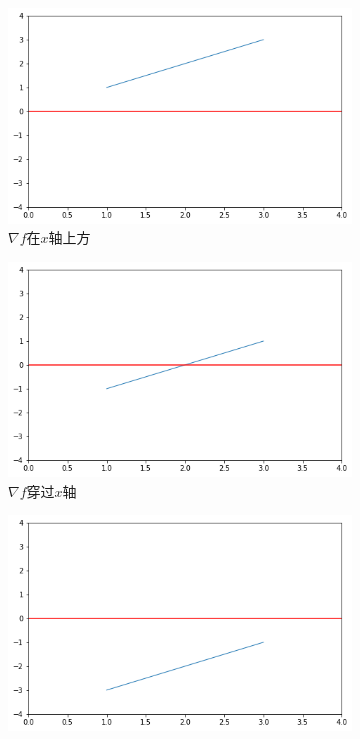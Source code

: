 \documentclass[lang=cn,10pt]{elegantbook}
\begin{document}
\begin{figure}[h]
	\centering
	\begin{subfigure}{0.4\linewidth}
		\includegraphics[width=\linewidth]{img/cf4_1.png}
		\caption{$\nabla f$在$x$轴上方}
		\label{cf4_1}
	\end{subfigure}
	\hspace{0.5in} %
	\begin{subfigure}{0.4\linewidth}
		\includegraphics[width=\linewidth]{img/cf4_2.png}
		\caption{$\nabla f$穿过$x$轴}
		\label{cf4_2}
	\end{subfigure}
	\hspace{0.5in} %
	\begin{subfigure}{0.4\linewidth}
		\includegraphics[width=\linewidth]{img/cf4_3.png}

\end{subfigure}
\end{figure}
\end{document}
